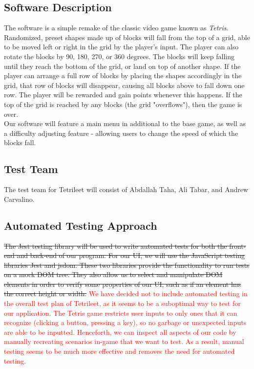 \documentclass[12pt, titlepage]{article}
\begin{document}
\subsection{Software Description}

The software is a simple remake of the classic video game known as \emph{Tetris}. Randomized, preset shapes made up of blocks will fall from the top of a grid, able to be moved left or right in the grid by the player's input. The player can also rotate the blocks by 90, 180, 270, or 360 degrees. The blocks will keep falling until they reach the bottom of the grid, or land on top of another shape. If the player can arrange a full row of blocks by placing the shapes accordingly in the grid, that row of blocks will disappear, causing all blocks above to fall down one row. The player will be rewarded and gain points whenever this happens. If the top of the grid is reached by any blocks (the grid "overflows"), then the game is over.\\
Our software will feature a main menu in additional to the base game, as well as a difficulty adjusting feature - allowing users to change the speed of which the blocks fall.

\subsection{Test Team}
The test team for Tetrileet will consist of Abdallah Taha, Ali Tabar, and Andrew Carvalino.

\subsection{Automated Testing Approach}
\sout{The Jest testing library will be used to write automated tests for both the front-end and back-end of our program. For our UI, we will use the JavaScript testing libraries Jest and jsdom. These two libraries provide the functionality to run tests on a mock DOM tree. They also allow us to select and manipulate DOM elements in order to verify some properties of our UI, such as if an element has the correct height or width.} \textcolor{red}{We have decided not to include automated testing in the overall test plan of Tetrileet, as it seems to be a suboptimal way to test for our application. The Tetris game restricts user inputs to only ones that it can recognize (clicking a button, pressing a key), so no garbage or unexpected inputs are able to be inputted. Henceforth, we can inspect all aspects of our code by manually recreating scenarios in-game that we want to test. As a result, manual testing seems to be much more effective and removes the need for automated testing.}
\end{document}
